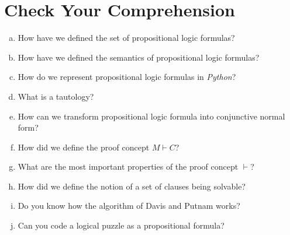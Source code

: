 \pagebreak


\section{Check Your Comprehension}
\begin{enumerate}[(a)]
\item How have we defined the set of propositional logic formulas?
\item How have we defined the semantics of propositional logic formulas?
\item How do we represent propositional logic formulas in \textsl{Python}?
\item What is a tautology?
\item How can we transform propositional logic formula into conjunctive normal
      form?
\item How did we define the proof concept $M \vdash C$?
\item What are the most important properties of the proof concept $\vdash$?
\item How did we define the notion of a set of clauses being solvable?
\item Do you know how the algorithm of Davis and Putnam works?
\item Can you code a logical puzzle as a propositional formula?
\end{enumerate}


%

